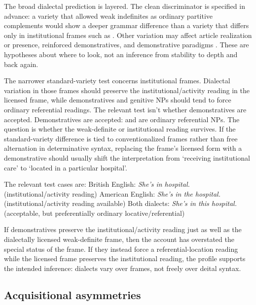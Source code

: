 \documentclass[12pt,letterpaper]{article}
\begin{document}
The broad dialectal prediction is layered. The clean discriminator is specified in advance: a variety that allowed weak indefinites as ordinary partitive  complements would show a deeper grammar difference than a variety that differs only in institutional frames such as . Other variation may affect article realization or presence, reinforced demonstratives, and demonstrative paradigms \parencite{Jones2002,RuppTagliamonte2019ZeroArticle,RuppTagliamonte2019ThisHere,HazenHamiltonVacovsky2011}. These are hypotheses about where to look, not an inference from stability to depth and back again.

The narrower standard-variety test concerns institutional frames. Dialectal variation in those frames should preserve the institutional/activity reading in the licensed frame, while demonstratives and genitive NPs should tend to force ordinary referential readings. The relevant test isn't whether demonstratives are accepted. Demonstratives are accepted:  and  are ordinary referential NPs. The question is whether the weak-definite or institutional reading survives. If the standard-variety difference is tied to conventionalized frames rather than free alternation in determinative syntax, replacing the frame's licensed form with a demonstrative should usually shift the interpretation from `receiving institutional care' to `located in a particular hospital'.

The relevant test cases are:
\ea
    \ea British English: \textit{She's in hospital.} (institutional/activity reading)
    \ex American English: \textit{She's in the hospital.} (institutional/activity reading available)
    \ex Both dialects: \textit{She's in this hospital.} (acceptable, but preferentially ordinary locative/referential)
    \z
\z

\noindent If demonstratives preserve the institutional/activity reading just as well as the dialectally licensed weak-definite frame, then the account has overstated the special status of the frame. If they instead force a referential-location reading while the licensed frame preserves the institutional reading, the profile supports the intended inference: dialects vary over frames, not freely over deital syntax.

\subsection{Acquisitional asymmetries}
\end{document}
